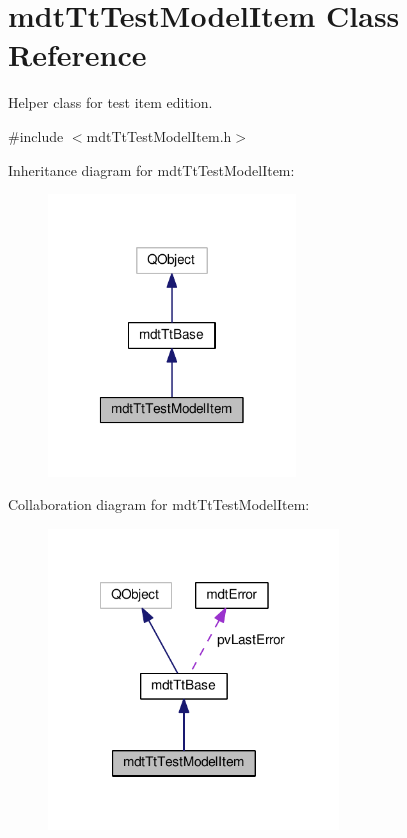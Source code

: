 \hypertarget{classmdt_tt_test_model_item}{\section{mdt\-Tt\-Test\-Model\-Item Class Reference}
\label{classmdt_tt_test_model_item}
}


Helper class for test item edition.  




{\ttfamily \#include $<$mdt\-Tt\-Test\-Model\-Item.\-h$>$}



Inheritance diagram for mdt\-Tt\-Test\-Model\-Item\-:
\nopagebreak
\begin{figure}[H]
\begin{center}
\leavevmode
\includegraphics[width=186pt]{classmdt_tt_test_model_item__inherit__graph}
\end{center}
\end{figure}


Collaboration diagram for mdt\-Tt\-Test\-Model\-Item\-:
\nopagebreak
\begin{figure}[H]
\begin{center}
\leavevmode
\includegraphics[width=218pt]{classmdt_tt_test_model_item__coll__graph}
\end{center}
\end{figure}
